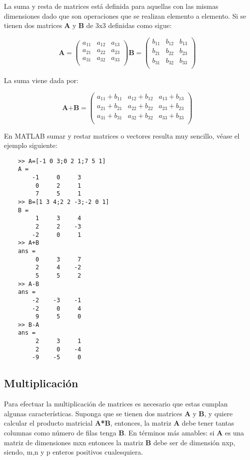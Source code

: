 La suma y resta de matrices está definida para aquellas con las mismas dimensiones 
dado que son operaciones que se realizan elemento a elemento. Si se tienen dos matrices 
\textbf{A} y \textbf{B} de 3x3 definidas como sigue:

$$
\textbf{A}=\begin{pmatrix}
a_{11} & a_{12} & a_{13} \\
a_{21} & a_{22} & a_{23} \\
a_{31} & a_{32} & a_{33} \\
\end{pmatrix}
\textbf{B}=\begin{pmatrix}
b_{11} & b_{12} & b_{13} \\
b_{21} & b_{22} & b_{23} \\
b_{31} & b_{32} & b_{33} \\
\end{pmatrix}
$$

La suma viene dada por:

$$
\textbf{A+B}=\begin{pmatrix}
a_{11}+b_{11} & a_{12}+b_{12} & a_{13}+b_{13} \\
a_{21}+b_{21} & a_{22}+b_{22} & a_{23}+b_{23} \\
a_{31}+b_{31} & a_{32}+b_{32} & a_{33}+b_{33} \\
\end{pmatrix}
$$

En MATLAB sumar y restar matrices o vectores resulta muy sencillo, véase el ejemplo siguiente:

\begin{verbatim}
	>> A=[-1 0 3;0 2 1;7 5 1]
	A =
	    -1     0     3
	     0     2     1
	     7     5     1
	>> B=[1 3 4;2 2 -3;-2 0 1]
	B =
	     1     3     4
	     2     2    -3
	    -2     0     1
	>> A+B
	ans =
	     0     3     7
	     2     4    -2
	     5     5     2
	>> A-B
	ans =
	    -2    -3    -1
	    -2     0     4
	     9     5     0
	>> B-A
	ans =
	     2     3     1
	     2     0    -4
	    -9    -5     0
\end{verbatim}


\subsection{Multiplicación}

Para efectuar la multiplicación de matrices es necesario que estas cumplan algunas características. 
Suponga que se tienen dos matrices \textbf{A} y \textbf{B}, y quiere calcular el producto matricial \textbf{A*B}, 
entonces, la matriz \textbf{A} debe tener tantas columnas como número de filas tenga \textbf{B}. En términos 
más amables: si \textbf{A} es una matriz de dimensiones mxn entonces la matriz \textbf{B} debe ser de dimensión 
nxp, siendo, m,n y p enteros positivos cualesquiera.\\

